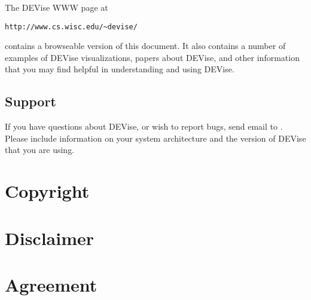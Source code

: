The DEVise WWW page at
\begin{verbatim}
http://www.cs.wisc.edu/~devise/
\end{verbatim}
contains a
browseable version of this document.  It also contains a number of examples
of DEVise visualizations, papers about DEVise, and other information that
you may find helpful in understanding and using DEVise.

\subsection{Support}

If you have questions about DEVise, or wish to report bugs, send email to
.  Please include information on your system
architecture and the version of DEVise that you are using.


\newpage 
\section*{Copyright}



\section*{Disclaimer}



\newpage
\section*{Agreement}





